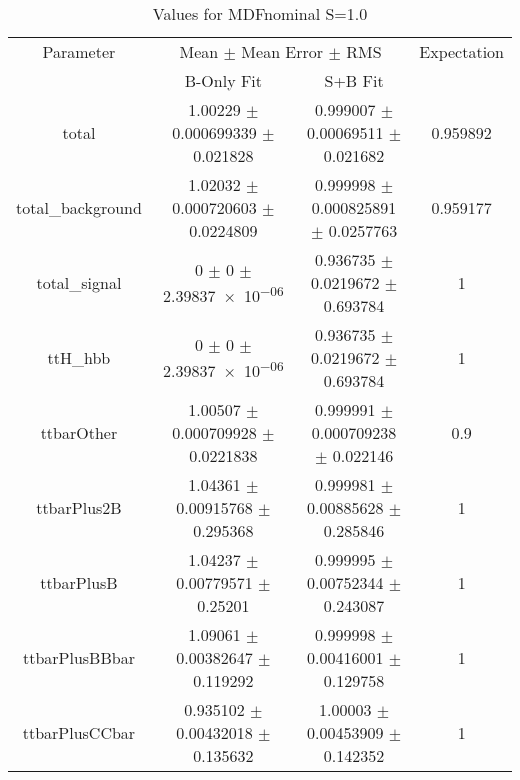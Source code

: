 \begin{table}
\centering
\caption{Values for MDFnominal S=1.0}
\begin{tabular}{cccc}
\toprule
Parameter & \multicolumn{2}{c}{Mean $\pm$ Mean Error $\pm$ RMS} & Expectation\\
 & B-Only Fit & S+B Fit & \\
\midrule
total & \num{1.00229} $\pm$ \num{0.000699339} $\pm$ \num{0.021828} & \num{0.999007} $\pm$ \num{0.00069511} $\pm$ \num{0.021682} & \num{0.959892}\\
total\_background & \num{1.02032} $\pm$ \num{0.000720603} $\pm$ \num{0.0224809} & \num{0.999998} $\pm$ \num{0.000825891} $\pm$ \num{0.0257763} & \num{0.959177}\\
total\_signal & \num{0} $\pm$ \num{0} $\pm$ \num{2.39837e-06} & \num{0.936735} $\pm$ \num{0.0219672} $\pm$ \num{0.693784} & \num{1}\\
ttH\_hbb & \num{0} $\pm$ \num{0} $\pm$ \num{2.39837e-06} & \num{0.936735} $\pm$ \num{0.0219672} $\pm$ \num{0.693784} & \num{1}\\
ttbarOther & \num{1.00507} $\pm$ \num{0.000709928} $\pm$ \num{0.0221838} & \num{0.999991} $\pm$ \num{0.000709238} $\pm$ \num{0.022146} & \num{0.9}\\
ttbarPlus2B & \num{1.04361} $\pm$ \num{0.00915768} $\pm$ \num{0.295368} & \num{0.999981} $\pm$ \num{0.00885628} $\pm$ \num{0.285846} & \num{1}\\
ttbarPlusB & \num{1.04237} $\pm$ \num{0.00779571} $\pm$ \num{0.25201} & \num{0.999995} $\pm$ \num{0.00752344} $\pm$ \num{0.243087} & \num{1}\\
ttbarPlusBBbar & \num{1.09061} $\pm$ \num{0.00382647} $\pm$ \num{0.119292} & \num{0.999998} $\pm$ \num{0.00416001} $\pm$ \num{0.129758} & \num{1}\\
ttbarPlusCCbar & \num{0.935102} $\pm$ \num{0.00432018} $\pm$ \num{0.135632} & \num{1.00003} $\pm$ \num{0.00453909} $\pm$ \num{0.142352} & \num{1}\\
\bottomrule
\end{tabular}
\end{table}